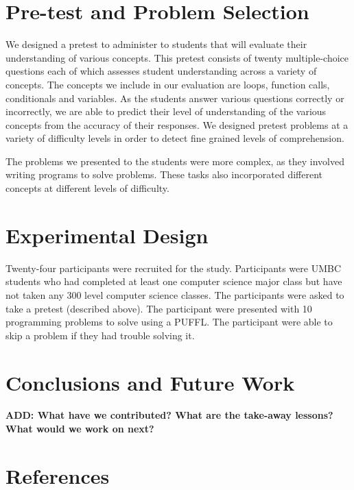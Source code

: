 \documentclass[twocolumn]{article}
\newcommand{\fix}[1]{{\bf #1}}
\begin{document}
\section{Pre-test and Problem Selection}
\label{sec:prob-selection}

We designed a pretest to administer to students that will evaluate their understanding of various concepts.  This pretest consists of twenty multiple-choice questions each of which assesses student understanding across a variety of concepts.  The concepts we include in our evaluation are loops, function calls, conditionals and variables.  As the students answer various questions correctly or incorrectly, we are able to predict their level of understanding of the various concepts from the accuracy of their responses.  We designed pretest problems at a variety of difficulty levels in order to detect fine grained levels of comprehension.

The problems we presented to the students were more complex, as they involved writing programs to solve problems.  These tasks also incorporated different concepts at different levels of difficulty.  

\section{Experimental Design}
\label{sec:exper-design}
 
Twenty-four participants were recruited for the study. Participants were UMBC students who had completed at least one computer science major class but have not taken any 300 level computer science classes.
The participants were asked to take a pretest (described above). The participant were presented with 10 programming problems to solve using a PUFFL. The participant  were able to skip a problem if they had trouble solving it.


\section{Conclusions and Future Work}
\label{conclusions}

\fix{ADD:  What have we contributed?  What are the take-away lessons?
  What would we work on next?}
  
\section*{References}
\end{document}
